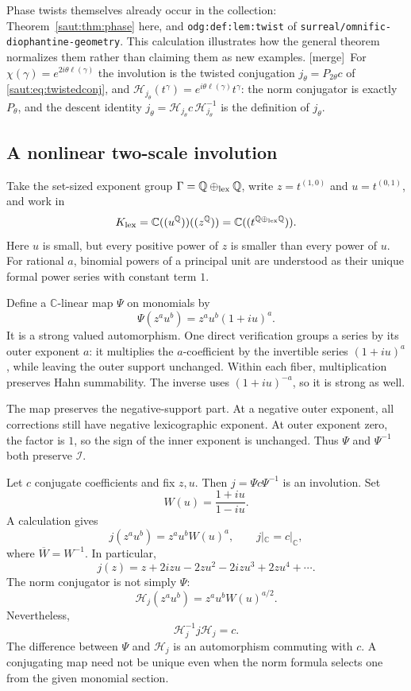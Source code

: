 \documentclass[11pt]{article}
\theoremstyle{definition}
\theoremstyle{remark}
\newcommand{\C}{\mathbb C}
\newcommand{\Q}{\mathbb Q}
\newcommand{\repo}[1]{\nolinkurl{#1}}%
\newcommand{\lbl}[1]{\nolinkurl{#1}}%
\newcommand{\Ineg}{\mathcal I}
\newcommand{\mergetag}{\textup{[merge]}}
\numberwithin{equation}{section}
\begin{document}
Phase twists themselves already occur in the collection:
Theorem~\ref{saut:thm:phase} here, and \lbl{odg:def:lem:twist} of
\repo{surreal/omnific-diophantine-geometry}. This calculation illustrates how the
general theorem normalizes them rather than claiming them as new examples.
\mergetag\ For $\chi(\gamma)=e^{2i\theta\ell(\gamma)}$ the involution is the twisted
conjugation $j_\theta=P_{2\theta}c$ of \eqref{saut:eq:twistedconj}, and
$\mathcal H_{j_\theta}(t^\gamma)=e^{i\theta\ell(\gamma)}t^\gamma$: the norm conjugator is
exactly $P_\theta$, and the descent identity $j_\theta=\mathcal H_{j_\theta}c\,\mathcal
H_{j_\theta}^{-1}$ is the definition of $j_\theta$.

\subsection{A nonlinear two-scale involution}

Take the set-sized exponent group $\Gamma=\Q\oplus_{\rm lex}\Q$, write $z=t^{(1,0)}$ and
$u=t^{(0,1)}$, and work in
\[
 K_{\mathrm{lex}}=\C((u^{\Q}))((z^{\Q}))=\C((t^{\Q\oplus_{\rm lex}\Q})).
\]
Here $u$ is small, but every positive power of $z$ is smaller than every power of $u$.
For rational $a$, binomial powers of a principal unit are understood as their unique
formal power series with constant term $1$.

Define a $\C$-linear map $\Psi$ on monomials by
\begin{equation}\label{saut:fs:eq:P-example}
 \Psi(z^a u^b)=z^a u^b(1+iu)^a.
\end{equation}
It is a strong valued automorphism. One direct verification groups a series by its
outer exponent $a$: it multiplies the $a$-coefficient by the invertible series
$(1+iu)^a$, while leaving the outer support unchanged. Within each fiber,
multiplication preserves Hahn summability. The inverse uses $(1+iu)^{-a}$, so it is
strong as well.

The map preserves the negative-support part. At a negative outer exponent, all
corrections still have negative lexicographic exponent. At outer exponent zero, the
factor is $1$, so the sign of the inner exponent is unchanged. Thus $\Psi$ and
$\Psi^{-1}$ both preserve $\Ineg$.

Let $c$ conjugate coefficients and fix $z,u$. Then $j=\Psi c\Psi^{-1}$ is an
involution. Set
\[
 W(u)=\frac{1+iu}{1-iu}.
\]
A calculation gives
\begin{equation}\label{saut:fs:eq:sigma-example}
 j(z^a u^b)=z^a u^bW(u)^a,\qquad j|_\C=c|_\C,
\end{equation}
where $\overline{W}=W^{-1}$. In particular,
\[
 j(z)=z+2izu-2zu^2-2izu^3+2zu^4+\cdots.
\]
The norm conjugator is not simply $\Psi$:
\begin{equation}\label{saut:fs:eq:H-example}
 \mathcal H_j(z^a u^b)=z^a u^bW(u)^{a/2}.
\end{equation}
Nevertheless,
\[
 \mathcal H_j^{-1}j\mathcal H_j=c.
\]
The difference between $\Psi$ and $\mathcal H_j$ is an automorphism commuting with
$c$. A conjugating map need not be unique even when the norm formula selects one from
the given monomial section.
\end{document}
